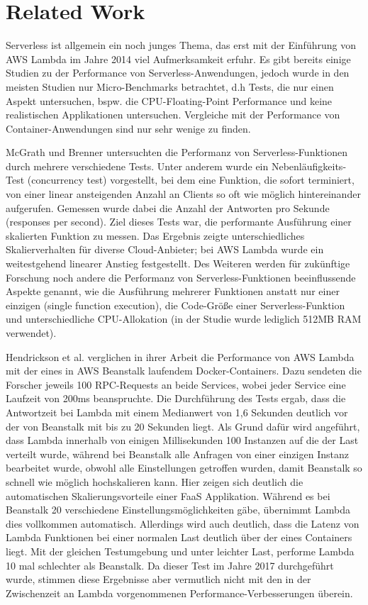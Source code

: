 \section{Related Work}
Serverless ist allgemein ein noch junges Thema, das erst mit der Einführung von AWS Lambda im Jahre 2014 viel Aufmerksamkeit erfuhr. Es gibt bereits einige Studien zu der Performance von Serverless-Anwendungen, jedoch wurde in den meisten Studien nur Micro-Benchmarks betrachtet, d.h Tests, die nur einen Aspekt untersuchen, bspw. die CPU-Floating-Point Performance und keine realistischen Applikationen untersuchen\cite{scheuner_function-as--service_2020}. Vergleiche mit der Performance von Container-Anwendungen sind nur sehr wenige zu finden. 

McGrath und Brenner untersuchten die Performanz von Serverless-Funktionen durch mehrere verschiedene Tests. Unter anderem wurde ein Nebenläufigkeits-Test (concurrency test) vorgestellt, bei dem eine Funktion, die sofort terminiert, von einer linear ansteigenden Anzahl an Clients so oft wie möglich hintereinander aufgerufen. Gemessen wurde dabei die Anzahl der Antworten pro Sekunde (responses per second). Ziel dieses Tests war, die performante Ausführung einer skalierten Funktion zu messen. Das Ergebnis zeigte unterschiedliches Skalierverhalten für diverse Cloud-Anbieter; bei AWS Lambda wurde ein weitestgehend linearer Anstieg festgestellt. 
Des Weiteren werden für zukünftige Forschung noch andere die Performanz von Serverless-Funktionen beeinflussende Aspekte genannt, wie die Ausführung mehrerer Funktionen anstatt nur einer einzigen (single function execution), die Code-Größe einer Serverless-Funktion und unterschiedliche CPU-Allokation (in der Studie wurde lediglich 512MB RAM verwendet).

Hendrickson et al. verglichen in ihrer Arbeit die Performance von AWS Lambda mit der eines in AWS Beanstalk laufendem Docker-Containers\cite{hendrickson_serverless_2017}. Dazu sendeten die Forscher jeweils 100 RPC-Requests an beide Services, wobei jeder Service eine Laufzeit von 200ms beanspruchte. Die Durchführung des Tests ergab, dass die Antwortzeit bei Lambda mit einem Medianwert von 1,6 Sekunden deutlich vor der von Beanstalk mit bis zu 20 Sekunden liegt. Als Grund dafür wird angeführt, dass Lambda innerhalb von einigen Millisekunden 100 Instanzen auf die der Last verteilt wurde, während bei Beanstalk alle Anfragen von einer einzigen Instanz bearbeitet wurde, obwohl alle Einstellungen getroffen wurden, damit Beanstalk so schnell wie möglich hochskalieren kann. Hier zeigen sich deutlich die automatischen Skalierungsvorteile einer FaaS Applikation. Während es bei Beanstalk 20 verschiedene Einstellungsmöglichkeiten gäbe, übernimmt Lambda dies vollkommen automatisch.
Allerdings wird auch deutlich, dass die Latenz von Lambda Funktionen bei einer normalen Last deutlich über der eines Containers liegt. Mit der gleichen Testumgebung und unter leichter Last, performe Lambda 10 mal schlechter als Beanstalk. Da dieser Test im Jahre 2017 durchgeführt wurde, stimmen diese Ergebnisse aber vermutlich nicht mit den in der Zwischenzeit an Lambda vorgenommenen Performance-Verbesserungen überein.

